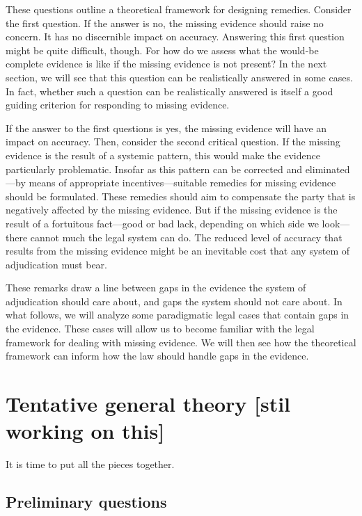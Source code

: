 \documentclass[
  10pt,
  dvipsnames,enabledeprecatedfontcommands]{scrartcl}
\begin{document}
\noindent These questions outline a theoretical framework for designing
remedies. Consider the first question. If the answer is no, the missing
evidence should raise no concern. It has no discernible impact on
accuracy. Answering this first question might be quite difficult,
though. For how do we assess what the would-be complete evidence is like
if the missing evidence is not present? In the next section, we will see
that this question can be realistically answered in some cases. In fact,
whether such a question can be realistically answered is itself a good
guiding criterion for responding to missing evidence.

If the answer to the first questions is yes, the missing evidence will
have an impact on accuracy. Then, consider the second critical question.
If the missing evidence is the result of a systemic pattern, this would
make the evidence particularly problematic. Insofar as this pattern can
be corrected and eliminated---by means of appropriate
incentives---suitable remedies for missing evidence should be
formulated. These remedies should aim to compensate the party that is
negatively affected by the missing evidence. But if the missing evidence
is the result of a fortuitous fact---good or bad lack, depending on
which side we look---there cannot much the legal system can do. The
reduced level of accuracy that results from the missing evidence might
be an inevitable cost that any system of adjudication must bear.

These remarks draw a line between gaps in the evidence the system of
adjudication should care about, and gaps the system should not care
about. In what follows, we will analyze some paradigmatic legal cases
that contain gaps in the evidence. These cases will allow us to become
familiar with the legal framework for dealing with missing evidence. We
will then see how the theoretical framework can inform how the law
should handle gaps in the evidence.

\hypertarget{tentative-general-theory-stil-working-on-this}{%
\section{Tentative general theory {[}stil working on
this{]}}\label{tentative-general-theory-stil-working-on-this}}

It is time to put all the pieces together.

\hypertarget{preliminary-questions}{%
\subsection{Preliminary questions}\label{preliminary-questions}}
\end{document}
